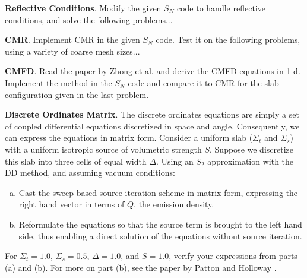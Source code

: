 \begin{exercises}
  \item \textbf{Reflective Conditions}. Modify the given $S_N$ code to handle reflective conditions, and solve the following problems...

  \item \textbf{CMR}.  Implement CMR in the given $S_N$ code.  Test it on the following problems, using a variety of coarse mesh sizes...

  \item \textbf{CMFD}.  Read the paper by Zhong et al. \cite{zhong2008itl} and derive the CMFD equations in 1-d.  Implement the method in the $S_N$ code and compare it to CMR for the slab configuration given in the last problem.

  \item \textbf{Discrete Ordinates Matrix}.  The discrete ordinates equations are simply a set of coupled differential equations discretized in space and angle.  Consequently, we can express the equations in matrix form.  Consider a uniform slab ($\Sigma_t$ and $\Sigma_s$) with a uniform isotropic source of volumetric strength $S$. Suppose we discretize this slab into three cells of equal width $\Delta$.  Using an $S_2$ approximation with the DD method, and assuming vacuum conditions:
  \begin{enumerate}[(a)]
    \item Cast the sweep-based source iteration scheme in matrix form, expressing the right hand vector in terms of $Q$, the emission density.         
    \item Reformulate the equations so that the source term is brought to the left hand side, thus enabling a direct solution of the equations without source iteration.  
   \end{enumerate}
  For $\Sigma_t = 1.0$, $\Sigma_s = 0.5$, $\Delta = 1.0$, and $S = 1.0$, verify your expressions from parts (a) and (b).  For more on part (b), see the paper by Patton and Holloway \cite{patton2002apg}.

\end{exercises}
